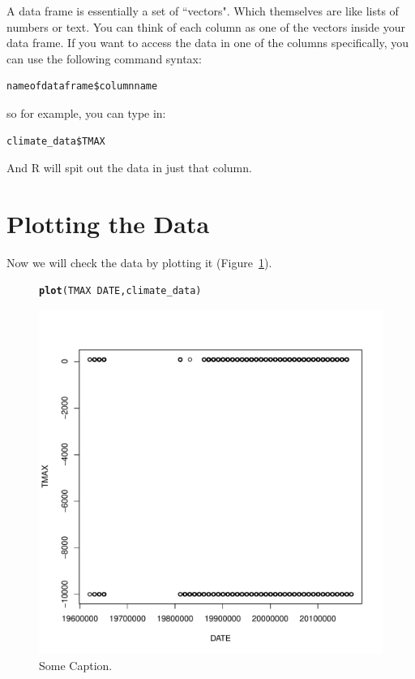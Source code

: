 \documentclass{article}\usepackage[]{graphicx}\usepackage[]{color}
\makeatletter
\def\maxwidth{ %
  \ifdim\Gin@nat@width>\linewidth
    \linewidth
  \else
    \Gin@nat@width
  \fi
}
\newcommand{\hlopt}[1]{\textcolor[rgb]{0,0,0}{#1}}%
\newcommand{\hlstd}[1]{\textcolor[rgb]{0.345,0.345,0.345}{#1}}%
\newcommand{\hlkwd}[1]{\textcolor[rgb]{0.737,0.353,0.396}{\textbf{#1}}}%
\newenvironment{kframe}{%
 \def\at@end@of@kframe{}%
 \ifinner\ifhmode%
  \def\at@end@of@kframe{\end{minipage}}%
  \begin{minipage}{\columnwidth}%
 \fi\fi%
 \def\FrameCommand##1{\hskip\@totalleftmargin \hskip-\fboxsep
 \colorbox{shadecolor}{##1}\hskip-\fboxsep
     \hskip-\linewidth \hskip-\@totalleftmargin \hskip\columnwidth}%
 \MakeFramed {\advance\hsize-\width
   \@totalleftmargin\z@ \linewidth\hsize
   \@setminipage}}%
 {\par\unskip\endMakeFramed%
 \at@end@of@kframe}
\newenvironment{knitrout}{}{} %
\makeatother
\begin{document}
A data frame is essentially a set of ``vectors". Which themselves are like lists of numbers or text. You can think of each column as one of the vectors inside your data frame. If you want to access the data in one of the columns specifically, you can use the following command syntax:

\begin{verbatim}
nameofdataframe$columnname
\end{verbatim}

so for example, you can type in:

\begin{verbatim}
climate_data$TMAX
\end{verbatim}

And R will spit out the data in just that column. 

\section{Plotting the Data}

Now we will check the data by plotting it (Figure~\ref{fig:plotmissing}).

\begin{figure}
\begin{knitrout}
\color{fgcolor}\begin{kframe}
\begin{alltt}
\hlkwd{plot}\hlstd{(TMAX}\hlopt{~}\hlstd{DATE, climate_data)}
\end{alltt}
\end{kframe}
\includegraphics[width=\maxwidth]{figure/unnamed-chunk-6-1} 

\end{knitrout}
\caption{Some Caption.}
\label{fig:plotmissing}
\end{figure}
\end{document}
